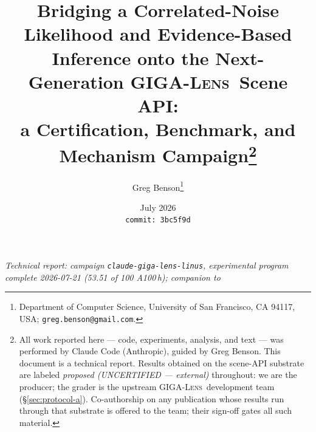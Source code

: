 \providecommand{\thetaE}{\ensuremath{\theta_{\mathrm{E}}}}
\providecommand{\gammaEPL}{\ensuremath{\gamma}}
\providecommand{\Rhat}{\ensuremath{\hat{R}}}
\providecommand{\ESS}{\textrm{ESS}}
\providecommand{\eop}{\ensuremath{e_{\mathrm{op}}}}
\providecommand{\gigalens}{\textsc{GIGA-Lens}}
\providecommand{\gigalenstwo}{\textsc{GIGA-Lens\,2.0}}
\providecommand{\foundry}{DESI--165.4754$-$06.0423}
\providecommand{\blackjax}{\textsc{BlackJAX}}
\providecommand{\art}[1]{\footnote{Source artifact: \texttt{#1}.}}
\providecommand{\dfile}[1]{\texttt{#1}}
\providecommand{\subtitle}[1]{\begin{center}\large\itshape #1\end{center}}
\providecommand{\sboot}{\ensuremath{\sigma_{\mathrm{boot}}}}
\providecommand{\sseed}{\ensuremath{\sigma_{\mathrm{seed}}}}
\providecommand{\logZ}{\ensuremath{\log Z}}
\providecommand{\dlogZ}{\ensuremath{\Delta\log Z}}
\providecommand{\sceneapi}{scene API}
\providecommand{\vendorpin}{\texttt{80916d2}}

\title{Bridging a Correlated-Noise Likelihood and Evidence-Based Inference
       onto the Next-Generation \gigalens\ Scene API:\\
       a Certification, Benchmark, and Mechanism Campaign\thanks{All work
       reported here --- code, experiments, analysis, and text --- was
       performed by Claude Code (Anthropic), guided by Greg Benson. This
       document is a technical report. Results obtained on the scene-API
       substrate are labeled \emph{proposed (UNCERTIFIED --- external)}
       throughout: we are the producer; the grader is the upstream
       \gigalens\ development team (\S\ref{sec:protocol-a}). Co-authorship
       on any publication whose results run through that substrate is
       offered to the team; their sign-off gates all such material.}}
\author{Greg Benson\thanks{Department of Computer Science, University of
        San Francisco, CA 94117, USA; \texttt{greg.benson@gmail.com}.}}
\date{July 2026\\[3pt]{\small\texttt{commit:~3bc5f9d}}}

\maketitle
\subtitle{Technical report: campaign \texttt{claude-giga-lens-linus},
experimental program complete 2026-07-21 (53.51 of 100 A100\,h);
companion to \citet{cgl2026companion}}


